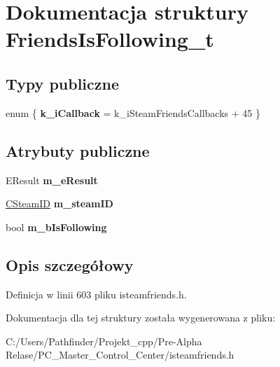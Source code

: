 \hypertarget{struct_friends_is_following__t}{}\section{Dokumentacja struktury Friends\+Is\+Following\+\_\+t}
\label{struct_friends_is_following__t}
\subsection*{Typy publiczne}
\begin{DoxyCompactItemize}
\item 
\mbox{\label{struct_friends_is_following__t_a7f2b425883e6f40c4eaaeabc9ac5e1b3}} 
enum \{ {\bfseries k\+\_\+i\+Callback} = k\+\_\+i\+Steam\+Friends\+Callbacks + 45
 \}
\end{DoxyCompactItemize}
\subsection*{Atrybuty publiczne}
\begin{DoxyCompactItemize}
\item 
\mbox{\label{struct_friends_is_following__t_a3b16099ca5e8413bc06e75ba7ca2d661}} 
E\+Result {\bfseries m\+\_\+e\+Result}
\item 
\mbox{\label{struct_friends_is_following__t_a47bc07cbc639db1baa21226abfcf5f43}} 
\hyperlink{class_c_steam_i_d}{C\+Steam\+ID} {\bfseries m\+\_\+steam\+ID}
\item 
\mbox{\label{struct_friends_is_following__t_a2659bb60c6ccb761653f16401f5281f5}} 
bool {\bfseries m\+\_\+b\+Is\+Following}
\end{DoxyCompactItemize}


\subsection{Opis szczegółowy}


Definicja w linii 603 pliku isteamfriends.\+h.



Dokumentacja dla tej struktury została wygenerowana z pliku\+:\begin{DoxyCompactItemize}
\item 
C\+:/\+Users/\+Pathfinder/\+Projekt\+\_\+cpp/\+Pre-\/\+Alpha Relase/\+P\+C\+\_\+\+Master\+\_\+\+Control\+\_\+\+Center/isteamfriends.\+h\end{DoxyCompactItemize}
